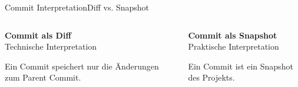 \documentclass{setbeamer}
\begin{document}
\begin{frame}[c]{Commit Interpretation}{Diff vs. Snapshot}
    \begin{columns}[T]
        \begin{column}{0.5\textwidth}
            \textbf{Commit als Diff}\\Technische Interpretation

            \vspace{3mm}
            Ein Commit speichert nur die Änderungen zum Parent Commit.
        \end{column}

        \begin{column}{0.5\textwidth}
            \textbf{Commit als Snapshot}\\Praktische Interpretation

            \vspace{3mm}
            Ein Commit ist ein Snapshot des Projekts.
        \end{column}
    \end{columns}
\end{frame}
\end{document}
